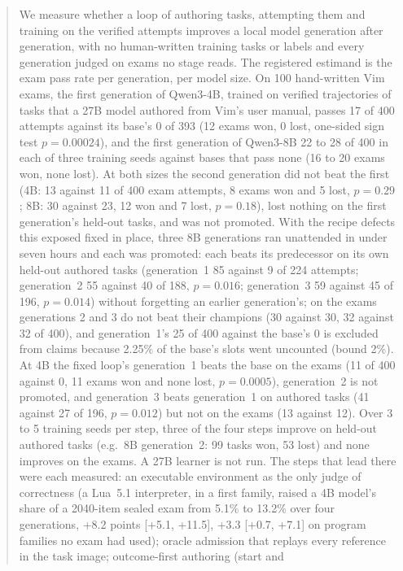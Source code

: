 \begin{abstract}
We measure whether a loop of authoring tasks, attempting them and training on the verified attempts improves a local model
generation after generation, with no human-written training tasks or labels and every generation judged on exams no stage
reads. The registered estimand is the exam pass rate per generation, per model size. On 100 hand-written Vim exams, the first
generation of Qwen3-4B, trained on verified trajectories of tasks that a 27B model authored from Vim's user manual, passes 17 of
400 attempts against its base's 0 of 393 (12 exams won, 0 lost, one-sided sign test $p=0.00024$), and the first generation
of Qwen3-8B 22 to 28 of 400 in each of three training seeds against bases that pass none (16 to 20 exams won, none lost). At both sizes the second generation did not beat the first (4B: 13 against 11 of 400 exam attempts, 8 exams won and
5 lost, $p=0.29$; 8B: 30 against 23, 12 won and 7 lost, $p=0.18$), lost nothing on the first generation's held-out tasks, and
was not promoted. With the recipe defects this exposed fixed in place, three 8B generations ran unattended in under seven
hours and each was promoted: each beats its predecessor on its own held-out authored tasks (generation~1 85 against 9 of 224
attempts; generation~2 55 against 40 of 188, $p=0.016$; generation~3 59 against 45 of 196, $p=0.014$) without forgetting an
earlier generation's; on the exams generations 2 and 3 do not beat their champions (30 against 30, 32 against 32 of 400),
and generation~1's 25 of 400 against the base's 0 is excluded from claims because 2.25\% of the base's slots went
uncounted (bound 2\%). At 4B the fixed loop's generation~1 beats the base on the exams (11 of 400 against 0, 11 exams won and
none lost, $p=0.0005$), generation~2 is not promoted, and generation~3 beats generation~1 on authored tasks (41 against 27 of
196, $p=0.012$) but not on the exams (13 against 12). Over 3 to 5 training seeds per step, three of the four steps improve on held-out
authored tasks (e.g.\ 8B generation~2: 99 tasks won, 53 lost) and none improves on the exams. A 27B learner is not run. The steps that lead there were each measured: an
executable environment as the only judge of correctness (a Lua~5.1 interpreter, in a first family, raised a 4B model's share
of a 2040-item sealed exam from 5.1\% to 13.2\% over four generations, +8.2 points [+5.1, +11.5], +3.3 [+0.7, +7.1] on program
families no exam had used); oracle admission that replays every reference in the task image; outcome-first authoring (start and

\end{abstract}
